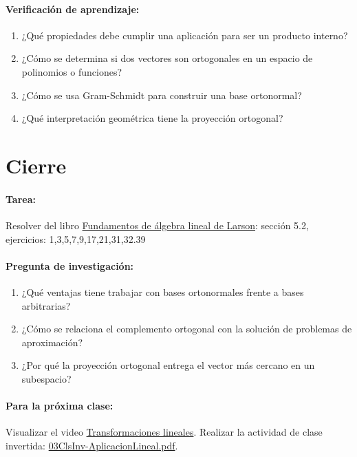 \documentclass[a4,11pt]{aleph-notas}
\begin{document}
\paragraph{Verificación de aprendizaje:}
\begin{enumerate}[leftmargin=*]
    \item ¿Qué propiedades debe cumplir una aplicación para ser un producto interno?
    \item ¿Cómo se determina si dos vectores son ortogonales en un espacio de polinomios o funciones?
    \item ¿Cómo se usa Gram-Schmidt para construir una base ortonormal?
    \item ¿Qué interpretación geométrica tiene la proyección ortogonal?
\end{enumerate}

\section*{Cierre}

\paragraph{Tarea:}
Resolver del libro \href{https://catalogobiblioteca.puce.edu.ec/cgi-bin/koha/opac-detail.pl?biblionumber=86081}{Fundamentos de álgebra lineal de Larson}: sección 5.2, ejercicios: 1,3,5,7,9,17,21,31,32.39

\paragraph{Pregunta de investigación:}
\begin{enumerate}[leftmargin=*]
    \item ¿Qué ventajas tiene trabajar con bases ortonormales frente a bases arbitrarias?
    \item ¿Cómo se relaciona el complemento ortogonal con la solución de problemas de aproximación?
    \item ¿Por qué la proyección ortogonal entrega el vector más cercano en un subespacio?
\end{enumerate}

\paragraph{Para la próxima clase:}  
Visualizar el video \href{https://youtu.be/YJfS4_m_0Z8?si=kFS74G3kXhWGWq4L}{Transformaciones lineales}.
Realizar la actividad de clase invertida: \href{https://fcena-puce.github.io/AlgebraLineal-05-N0048/07Act-ClaseInvertida/03ClsInv-AplicacionLineal.pdf}{03ClsInv-AplicacionLineal.pdf}.
\end{document}
